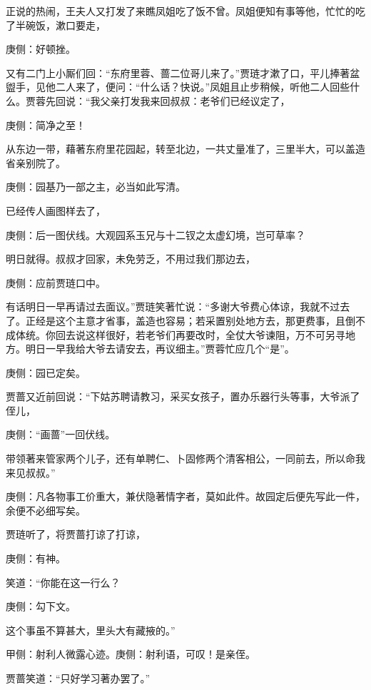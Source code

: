 \begin{parag}
    正说的热闹，王夫人又打发了来瞧凤姐吃了饭不曾。凤姐便知有事等他，忙忙的吃了半碗饭，漱口要走，\begin{note}庚侧：好顿挫。\end{note}又有二门上小厮们回：“东府里蓉、蔷二位哥儿来了。”贾琏才漱了口，平儿捧著盆盥手，见他二人来了，便问：“什么话？快说。”凤姐且止步稍候，听他二人回些什么。贾蓉先回说：“我父亲打发我来回叔叔：老爷们已经议定了，\begin{note}庚侧：简净之至！\end{note}从东边一带，藉著东府里花园起，转至北边，一共丈量准了，三里半大，可以盖造省亲别院了。\begin{note}庚侧：园基乃一部之主，必当如此写清。\end{note}已经传人画图样去了，\begin{note}庚侧：后一图伏线。大观园系玉兄与十二钗之太虚幻境，岂可草率？\end{note}明日就得。叔叔才回家，未免劳乏，不用过我们那边去，\begin{note}庚侧：应前贾琏口中。\end{note}有话明日一早再请过去面议。”贾琏笑著忙说：“多谢大爷费心体谅，我就不过去了。正经是这个主意才省事，盖造也容易；若采置别处地方去，那更费事，且倒不成体统。你回去说这样很好，若老爷们再要改时，全仗大爷谏阻，万不可另寻地方。明日一早我给大爷去请安去，再议细主。”贾蓉忙应几个“是”。\begin{note}庚侧：园已定矣。\end{note}
\end{parag}


\begin{parag}
    贾蔷又近前回说：“下姑苏聘请教习，采买女孩子，置办乐器行头等事，大爷派了侄儿，\begin{note}庚侧：“画蔷”一回伏线。\end{note}带领著来管家两个儿子，还有单聘仁、卜固修两个清客相公，一同前去，所以命我来见叔叔。”\begin{note}庚侧：凡各物事工价重大，兼伏隐著情字者，莫如此件。故园定后便先写此一件，余便不必细写矣。\end{note}贾琏听了，将贾蔷打谅了打谅，\begin{note}庚侧：有神。\end{note}笑道：“你能在这一行么？\begin{note}庚侧：勾下文。\end{note}这个事虽不算甚大，里头大有藏掖的。”\begin{note}甲侧：射利人微露心迹。庚侧：射利语，可叹！是亲侄。\end{note}贾蔷笑道：“只好学习著办罢了。”
\end{parag}



